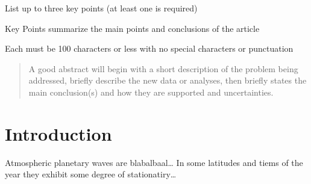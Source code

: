 \documentclass[draft,linenumbers]{agujournal2018}
\begin{document}



\begin{keypoints}
\item List up to three key points (at least one is required)
\item Key Points summarize the main points and conclusions of the article
\item Each must be 100 characters or less with no special characters or
punctuation
\end{keypoints}

%
%


\begin{abstract}
A good abstract will begin with a short description of the problem being
addressed, briefly describe the new data or analyses, then briefly
states the main conclusion(s) and how they are supported and
uncertainties.
\end{abstract}

\section{Introduction}

Atmospheric planetary waves are blabalbaal\ldots{} In some latitudes and
tiems of the year they exhibit some degree of stationatiry\ldots{}
\end{document}
